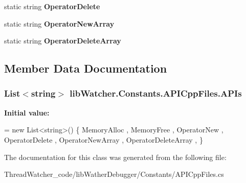 \begin{DoxyCompactItemize}
\item 
\hypertarget{classlib_watcher_1_1_constants_1_1_a_p_i_cpp_files_acbd6ba41d5acec2621173121bda0376f}{static string {\bfseries Operator\+Delete}}\label{classlib_watcher_1_1_constants_1_1_a_p_i_cpp_files_acbd6ba41d5acec2621173121bda0376f}

\item 
\hypertarget{classlib_watcher_1_1_constants_1_1_a_p_i_cpp_files_acb9d53620be53e45b1abbd69fdc8351e}{static string {\bfseries Operator\+New\+Array}}\label{classlib_watcher_1_1_constants_1_1_a_p_i_cpp_files_acb9d53620be53e45b1abbd69fdc8351e}

\item 
\hypertarget{classlib_watcher_1_1_constants_1_1_a_p_i_cpp_files_adaa0bc9ec0f94f349ca69d2bddec5f38}{static string {\bfseries Operator\+Delete\+Array}}\label{classlib_watcher_1_1_constants_1_1_a_p_i_cpp_files_adaa0bc9ec0f94f349ca69d2bddec5f38}

\end{DoxyCompactItemize}


\subsection{Member Data Documentation}
\hypertarget{classlib_watcher_1_1_constants_1_1_a_p_i_cpp_files_a8ba9d7dd44cf4102117c68360acae223}{
\subsubsection[{A\+P\+Is}]{\setlength{\rightskip}{0pt plus 5cm}List$<$string$>$ lib\+Watcher.\+Constants.\+A\+P\+I\+Cpp\+Files.\+A\+P\+Is\hspace{0.3cm}{\ttfamily [static]}}}\label{classlib_watcher_1_1_constants_1_1_a_p_i_cpp_files_a8ba9d7dd44cf4102117c68360acae223}
{\bfseries Initial value\+:}
\begin{DoxyCode}
= \textcolor{keyword}{new} List<string>() \{ 
            MemoryAlloc            ,
            MemoryFree             ,
            OperatorNew            ,
            OperatorDelete         ,
            OperatorNewArray       ,
            OperatorDeleteArray    ,
        \}
\end{DoxyCode}


The documentation for this class was generated from the following file\+:\begin{DoxyCompactItemize}
\item 
Thread\+Watcher\+\_\+code/lib\+Wather\+Debugger/\+Constants/A\+P\+I\+Cpp\+Files.\+cs\end{DoxyCompactItemize}

